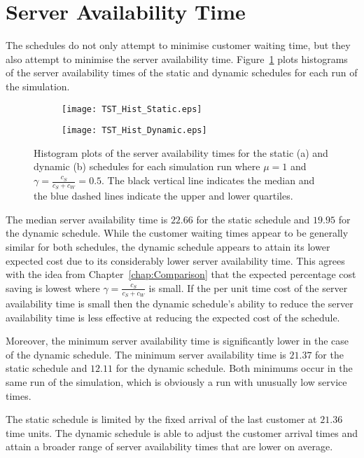 \section{Server Availability Time}
The schedules do not only attempt to minimise customer waiting time, but they also attempt to minimise the server availability time. Figure~\ref{fig:Two_Server} plots histograms of the server availability times of the static and dynamic schedules for each run of the simulation.
\begin{figure}[htb]
	\centering
	\begin{subfigure}[t]{0.45\textwidth}
		\centering
		\texttt{[image: TST\_Hist\_Static.eps]}
		\caption{}
	\end{subfigure}
	\begin{subfigure}[t]{0.45\textwidth}
		\centering
		\texttt{[image: TST\_Hist\_Dynamic.eps]}
		\caption{}
	\end{subfigure}
	\caption{Histogram plots of the server availability times for the static (a) and dynamic (b) schedules for each simulation run where $\mu = 1$ and $\gamma = \frac{c_{S}}{c_{S} + c_{W}} = 0.5$. The black vertical line indicates the median and the blue dashed lines indicate the upper and lower quartiles.}
	\label{fig:Two_Server}
\end{figure}

The median server availability time is $22.66$ for the static schedule and $19.95$ for the dynamic schedule. While the customer waiting times appear to be generally similar for both schedules, the dynamic schedule appears to attain its lower expected cost due to its considerably lower server availability time. This agrees with the idea from Chapter~\ref{chap:Comparison} that the expected percentage cost saving is lowest where $\gamma = \frac{c_{S}}{c_{S} + c_{W}}$ is small. If the per unit time cost of the server availability time is small then the dynamic schedule's ability to reduce the server availability time is less effective at reducing the expected cost of the schedule.

Moreover, the minimum server availability time is significantly lower in the case of the dynamic schedule. The minimum server availability time is $21.37$ for the static schedule and $12.11$ for the dynamic schedule. Both minimums occur in the same run of the simulation, which is obviously a run with unusually low service times.

The static schedule is limited by the fixed arrival of the last customer at $21.36$ time units. The dynamic schedule is able to adjust the customer arrival times and attain a broader range of server availability times that are lower on average.